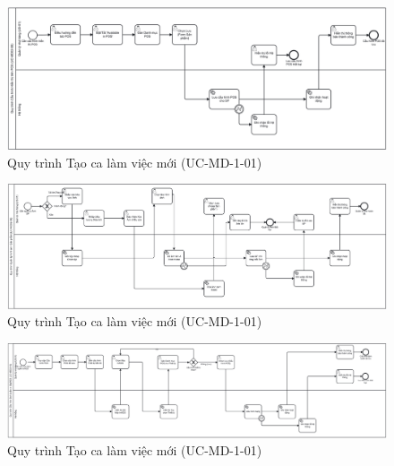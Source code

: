 
\begin{figure}[H]
	\centering
	\includegraphics[width=15cm]{Sections/tong_quan/functional_spec/img/2.8.png}

     \vspace{0.5cm}
    \caption{Quy trình Tạo ca làm việc mới (UC-MD-1-01)}
\end{figure}

\begin{figure}[H]
	\centering
	\includegraphics[width=15cm]{Sections/tong_quan/functional_spec/img/2.9.png}

     \vspace{0.5cm}
    \caption{Quy trình Tạo ca làm việc mới (UC-MD-1-01)}
\end{figure}

\begin{figure}[H]
	\centering
	\includegraphics[width=15cm]{Sections/tong_quan/functional_spec/img/2.10.png}

     \vspace{0.5cm}
    \caption{Quy trình Tạo ca làm việc mới (UC-MD-1-01)}
\end{figure}



